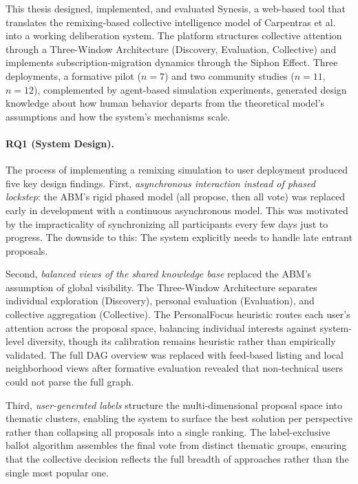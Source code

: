 \documentclass[a4paper, 12pt, twoside]{iviathesis}
\begin{document}
This thesis designed, implemented, and evaluated Synesis, a web-based tool that translates the remixing-based collective intelligence model of Carpentras et al.\ \cite{carpentras_empowering_2024, carpentras_wisdom_2025} into a working deliberation system. The platform structures collective attention through a Three-Window Architecture (Discovery, Evaluation, Collective) and implements subscription-migration dynamics through the Siphon Effect. Three deployments, a formative pilot ($n=7$) and two community studies ($n=11$, $n=12$), complemented by agent-based simulation experiments, generated design knowledge about how human behavior departs from the theoretical model's assumptions and how the system's mechanisms scale.

\paragraph{RQ1 (System Design).}
The process of implementing a remixing simulation to user deployment produced five key design findings. First, \textit{asynchronous interaction instead of phased lockstep}: the ABM's rigid phased model (all propose, then all vote) was replaced early in development with a continuous asynchronous model. This was motivated by the impracticality of synchronizing all participants every few days just to progress. The downside to this: The system explicitly needs to handle late entrant proposals.

Second, \textit{balanced views of the shared knowledge base} replaced the ABM's assumption of global visibility. The Three-Window Architecture separates individual exploration (Discovery), personal evaluation (Evaluation), and collective aggregation (Collective). The PersonalFocus heuristic routes each user's attention across the proposal space, balancing individual interests against system-level diversity, though its calibration remains heuristic rather than empirically validated. The full DAG overview was replaced with feed-based listing and local neighborhood views after formative evaluation revealed that non-technical users could not parse the full graph.

Third, \textit{user-generated labels} structure the multi-dimensional proposal space into thematic clusters, enabling the system to surface the best solution per perspective rather than collapsing all proposals into a single ranking. The label-exclusive ballot algorithm assembles the final vote from distinct thematic groups, ensuring that the collective decision reflects the full breadth of approaches rather than the single most popular one.
\end{document}
